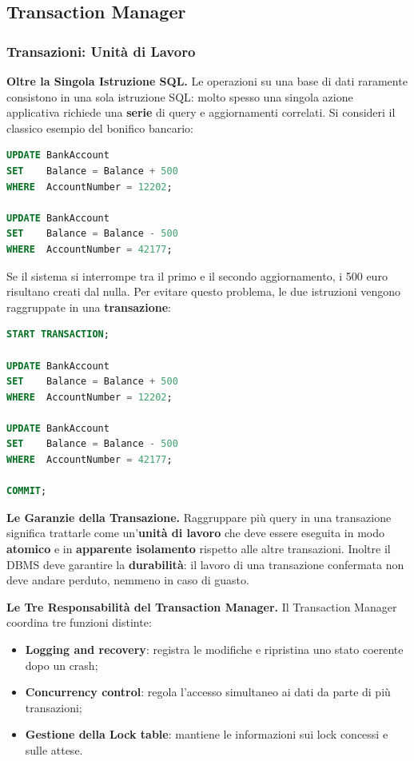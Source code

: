 \documentclass[12pt]{extarticle}
\begin{document}
\subsection{Transaction Manager}
\subsubsection{Transazioni: Unità di Lavoro}

\noindent \textbf{Oltre la Singola Istruzione SQL.} Le operazioni su una base di dati raramente consistono in una sola istruzione SQL: molto spesso una singola azione applicativa richiede una \textbf{serie} di query e aggiornamenti correlati. Si consideri il classico esempio del bonifico bancario:

\begin{lstlisting}[language=SQL, caption={Due aggiornamenti che devono essere eseguiti insieme}]
UPDATE BankAccount
SET    Balance = Balance + 500
WHERE  AccountNumber = 12202;

UPDATE BankAccount
SET    Balance = Balance - 500
WHERE  AccountNumber = 42177;
\end{lstlisting}

\noindent Se il sistema si interrompe tra il primo e il secondo aggiornamento, i 500 euro risultano creati dal nulla. Per evitare questo problema, le due istruzioni vengono raggruppate in una \textbf{transazione}:

\begin{lstlisting}[language=SQL, caption={Transazione esplicita per il bonifico}]
START TRANSACTION;

UPDATE BankAccount
SET    Balance = Balance + 500
WHERE  AccountNumber = 12202;

UPDATE BankAccount
SET    Balance = Balance - 500
WHERE  AccountNumber = 42177;

COMMIT;
\end{lstlisting}

\medskip
\noindent \textbf{Le Garanzie della Transazione.} Raggruppare più query in una transazione significa trattarle come un'\textbf{unità di lavoro} che deve essere eseguita in modo \textbf{atomico} e in \textbf{apparente isolamento} rispetto alle altre transazioni. Inoltre il DBMS deve garantire la \textbf{durabilità}: il lavoro di una transazione confermata non deve andare perduto, nemmeno in caso di guasto.

\medskip
\noindent \textbf{Le Tre Responsabilità del Transaction Manager.} Il Transaction Manager coordina tre funzioni distinte:
\begin{itemize}
    \item \textbf{Logging and recovery}: registra le modifiche e ripristina uno stato coerente dopo un crash;
    \item \textbf{Concurrency control}: regola l'accesso simultaneo ai dati da parte di più transazioni;
    \item \textbf{Gestione della Lock table}: mantiene le informazioni sui lock concessi e sulle attese.
\end{itemize}
\end{document}
